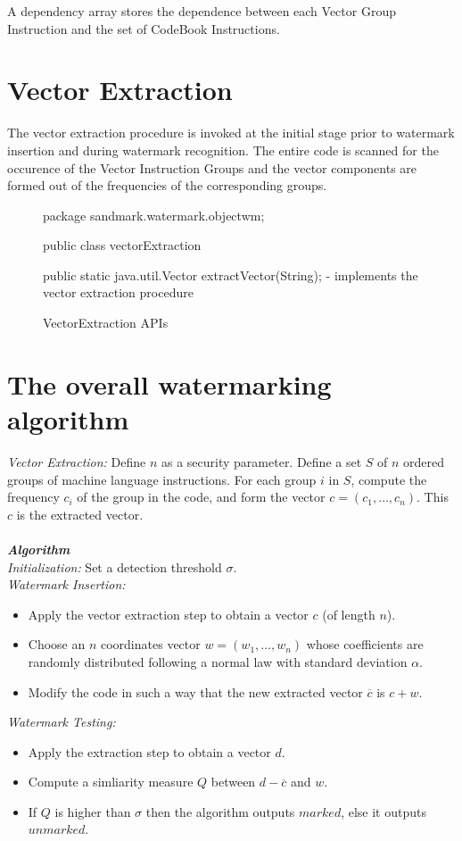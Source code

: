 A dependency array stores the dependence between each Vector Group Instruction
and the set of CodeBook Instructions.

\section{Vector Extraction }
The vector extraction procedure is invoked at the initial stage prior to watermark
insertion and during watermark recognition. The entire code is scanned for the 
occurence of the Vector Instruction Groups and the vector components are formed out
of the frequencies of the corresponding groups.
\begin{figure}
\begin{listing}{1}
package sandmark.watermark.objectwm;

public class vectorExtraction {

   public static java.util.Vector extractVector(String);
      - implements the vector extraction procedure
}
\end{listing}
\caption{VectorExtraction APIs}
\label{}
\end{figure}

\section{The overall watermarking algorithm }
{\em Vector Extraction: } Define $n$ as a security parameter. Define a set $S$ of
$n$ ordered groups of machine language instructions. For each group $i$ in $S$,
compute the frequency $c_i$ of the group in the code, and form the vector $c = 
(c_1, \ldots, c_n)$. This $c$ is the extracted vector. 
\\\\
{\bf {\em Algorithm}}
\\
{\em Initialization:} Set a detection threshold $\sigma $.
\\
{\em Watermark Insertion:}
\begin{itemize}
\item
Apply the vector extraction step to obtain a vector $c$ (of length $n$).
\item
Choose an $n$ coordinates vector $w = (w_1, \ldots , w_n)$ whose coefficients
are randomly distributed following a normal law with standard deviation $\alpha$.
\item
Modify the code in such a way that the new extracted vector $\overline c$ is $c + w$.
\end{itemize}
{\em Watermark Testing:}
\begin{itemize}
\item
Apply the extraction step to obtain a vector $d$.
\item
Compute a simliarity measure $Q$ between $d -\overline c$ and $w$.
\item
If $Q$ is higher than $\sigma$ then the algorithm outputs $marked$, else it
outputs $unmarked$.
\end{itemize}


